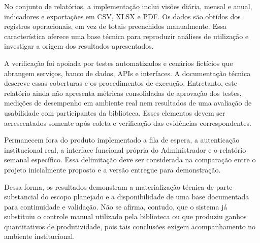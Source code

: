 No conjunto de relatórios, a implementação inclui visões diária, mensal e anual, indicadores e exportações em CSV, XLSX e PDF. Os dados são obtidos dos registros operacionais, em vez de totais preenchidos manualmente. Essa característica oferece uma base técnica para reproduzir análises de utilização e investigar a origem dos resultados apresentados.

A verificação foi apoiada por testes automatizados e cenários fictícios que abrangem serviços, banco de dados, APIs e interfaces. A documentação técnica descreve essas coberturas e os procedimentos de execução. Entretanto, este relatório ainda não apresenta métricas consolidadas de aprovação dos testes, medições de desempenho em ambiente real nem resultados de uma avaliação de usabilidade com participantes da biblioteca. Esses elementos devem ser acrescentados somente após coleta e verificação das evidências correspondentes.

Permanecem fora do produto implementado a fila de espera, a autenticação institucional real, a interface funcional própria do Administrador e o relatório semanal específico. Essa delimitação deve ser considerada na comparação entre o projeto inicialmente proposto e a versão entregue para demonstração.

Dessa forma, os resultados demonstram a materialização técnica de parte substancial do escopo planejado e a disponibilidade de uma base documentada para continuidade e validação. Não se afirma, contudo, que o sistema já substituiu o controle manual utilizado pela biblioteca ou que produziu ganhos quantitativos de produtividade, pois tais conclusões exigem acompanhamento no ambiente institucional.

